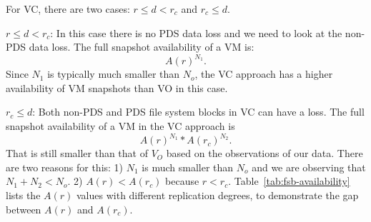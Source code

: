 For VC, there are two cases: $r \le d<r_c$ and $r_c \leq d$.  

\noindent $r \le d<r_c$:  In this case there is no PDS data loss and we need to look at the non-PDS data loss. 
The full snapshot availability of a VM is: 
\[
A(r)^{N_1}.
\]
Since $N_1$ is typically much smaller than $N_o$, 
the VC approach has a higher availability of VM snapshots than VO in this case.

\noindent $r_c \leq d$: Both non-PDS and PDS file system blocks in VC can have a loss.
The full snapshot availability of  a VM in the VC approach is
\[
A(r)^{N_1} * A(r_c)^{N_2}.
\]
That is still smaller than that of $V_O$ based on the observations of our data. There are two reasons for this:  
1) $N_1$ is much smaller than $N_o$ and we are observing that $N_1+N_2<N_o$. 
2)  $A(r) < A(r_c)$ because $r < r_c$.  
Table~\ref{tab:fsb-availability} lists the $A(r)$ values with
different replication degrees, to demonstrate the gap between  $A(r)$ and  $A(r_c)$.


